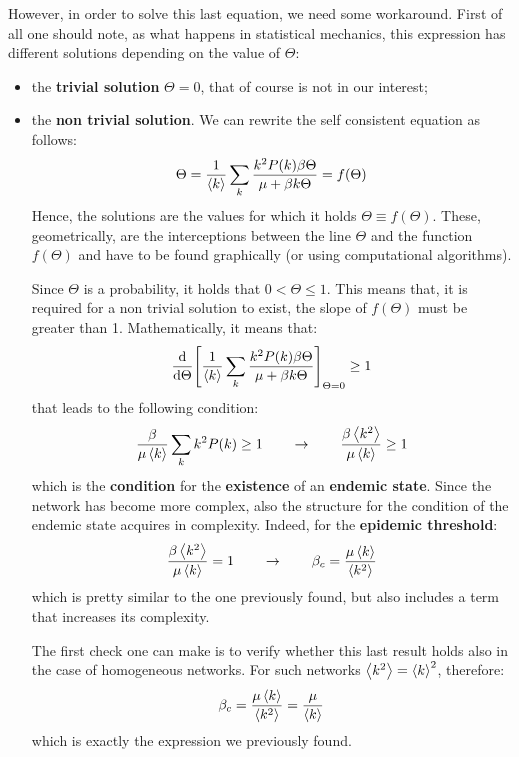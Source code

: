 \documentclass[../main/main.tex]{subfiles}
\begin{document}
However, in order to solve this last equation, we need some workaround. First of all one should note, as what happens in statistical mechanics, this expression has different solutions depending on the value of $\Theta$:
\begin{itemize}
\item the \textbf{trivial solution} \( \Theta =0 \), that of course is not in our interest;
\item the \textbf{non trivial solution}. We can rewrite the self consistent equation as follows:
\begin{equation*}
   \Theta = \frac{1}{\expval{k} } \sum_{k}^{} \frac{k^2 P(k) \beta \Theta }{\mu + \beta k \Theta } = f(\Theta )
\end{equation*}
Hence, the solutions are the values for which it holds \( \Theta \equiv f(\Theta )\). These, geometrically, are the interceptions between the line \( \Theta  \) and the function \( f(\Theta ) \) and have to be found graphically (or using computational algorithms).

Since \( \Theta  \) is a probability, it holds that \( 0<\Theta \le 1 \). This means that, it is required for a non trivial solution to exist, the slope of \( f(\Theta ) \) must be greater than 1.
Mathematically, it means that:
\begin{equation*}
  \dv{}{\Theta }  \qty[ \frac{1}{\expval{k} } \sum_{k}^{} \frac{k^2 P(k) \beta \Theta }{\mu + \beta k \Theta } ]_{\Theta =0} \ge 1
\end{equation*}
that leads to the following condition:
\begin{equation}
\frac{\beta }{\mu \expval{k} } \sum_{k}^{}k^2 P(k) \ge 1 \qquad \rightarrow  \qquad \frac{\beta \expval{k^2} }{\mu \expval{k} } \ge 1
\end{equation}
which is the \textbf{condition} for the \textbf{existence} of an \textbf{endemic state}. Since the network has become more complex, also the structure for the condition of the endemic state acquires in complexity. Indeed, for the \textbf{epidemic threshold}:
\begin{equation}
 \frac{\beta \expval{k^2} }{\mu \expval{k} } = 1 \qquad \rightarrow \qquad \beta _c = \frac{\mu \expval{k} }{\expval{k^2} }
\end{equation}
which is pretty similar to the one previously found, but also includes a term that increases its complexity.

The first check one can make is to verify whether this last result holds also in the case of homogeneous networks. For such networks \( \expval{k^2} = \expval{k}^2   \), therefore:
\begin{equation*}
  \beta _c = \frac{\mu \expval{k} }{\expval{k^2} } = \frac{\mu }{\expval{k} }
\end{equation*}
which is exactly the expression we previously found.

\end{itemize}
\end{document}

